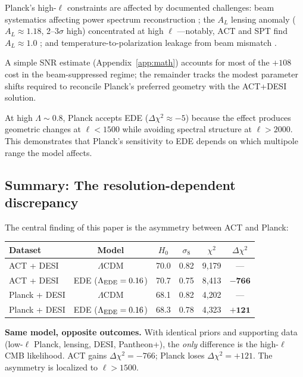 \documentclass[onecolumn,showpacs,preprintnumbers,amsmath,amssymb,prd]{revtex4-2}
\newcommand{\lcdm}{$\Lambda$CDM}
\begin{document}
Planck's high-$\ell$ constraints are affected by documented challenges: beam 
systematics affecting power spectrum reconstruction \cite{Planck2013VII,Planck2016HFI,Rocha2009}; 
the $A_L$ lensing anomaly ($A_L \approx 1.18$, 2--3$\sigma$ high) concentrated at 
high $\ell$ \cite{Planck2018VI}---notably, ACT and SPT find $A_L \approx 1.0$ 
\cite{ACT2020,SPT2021}; and temperature-to-polarization leakage from beam 
mismatch \cite{Miller2009,Hivon2016,Delouis2019}.

A simple SNR estimate (Appendix~\ref{app:math}) accounts for most of the 
$+108$ cost in the beam-suppressed regime; the remainder tracks the modest 
parameter shifts required to reconcile Planck's preferred geometry with the 
ACT+DESI solution.

At high $\Lambda \sim 0.8$, Planck accepts EDE ($\Delta\chi^2 \approx -5$) 
because the effect produces geometric changes at $\ell < 1500$ while avoiding 
spectral structure at $\ell > 2000$. This demonstrates that Planck's sensitivity 
to EDE depends on which multipole range the model affects.

\subsection{Summary: The resolution-dependent discrepancy}

The central finding of this paper is the asymmetry between ACT and Planck:
\begin{center}
\begin{tabular}{lccccc}
\toprule
Dataset & Model & $H_0$ & $\sigma_8$ & $\chi^2$ & $\Delta\chi^2$ \\
\midrule
ACT + DESI & \lcdm & 70.0 & 0.82 & 9{,}179 & --- \\
ACT + DESI & EDE ($\Lambda_{\rm EDE} = 0.16$) & 70.7 & 0.75 & 8{,}413 & $\mathbf{-766}$ \\
\midrule
Planck + DESI & \lcdm & 68.1 & 0.82 & 4{,}202 & --- \\
Planck + DESI & EDE ($\Lambda_{\rm EDE} = 0.16$) & 68.3 & 0.78 & 4{,}323 & $\mathbf{+121}$ \\
\bottomrule
\end{tabular}
\end{center}

\textbf{Same model, opposite outcomes.} With identical priors and supporting 
data (low-$\ell$ Planck, lensing, DESI, Pantheon+), the \emph{only} difference 
is the high-$\ell$ CMB likelihood. ACT gains $\Delta\chi^2 = -766$; Planck 
loses $\Delta\chi^2 = +121$. The asymmetry is localized to $\ell > 1500$.
\end{document}
